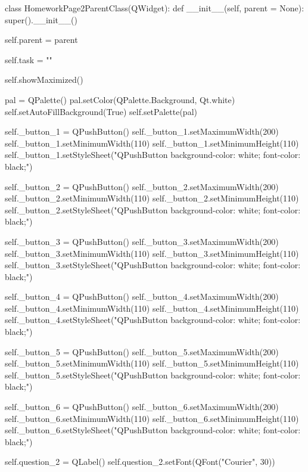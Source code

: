 \begin{python}
class HomeworkPage2ParentClass(QWidget):
    def __init__(self, parent = None):
        super().__init__()

        self.parent = parent

        self.task = ""

        self.showMaximized()

        pal = QPalette()
        pal.setColor(QPalette.Background, Qt.white)
        self.setAutoFillBackground(True)
        self.setPalette(pal)

        self._button_1 = QPushButton()
        self._button_1.setMaximumWidth(200)
        self._button_1.setMinimumWidth(110)
        self._button_1.setMinimumHeight(110)
        self._button_1.setStyleSheet("QPushButton {background-color: white; font-color: black;}")
        
        self._button_2 = QPushButton()
        self._button_2.setMaximumWidth(200)
        self._button_2.setMinimumWidth(110)
        self._button_2.setMinimumHeight(110)
        self._button_2.setStyleSheet("QPushButton {background-color: white; font-color: black;}")
  
        self._button_3 = QPushButton()
        self._button_3.setMaximumWidth(200)
        self._button_3.setMinimumWidth(110)
        self._button_3.setMinimumHeight(110)
        self._button_3.setStyleSheet("QPushButton {background-color: white; font-color: black;}")
        
        self._button_4 = QPushButton()
        self._button_4.setMaximumWidth(200)
        self._button_4.setMinimumWidth(110)
        self._button_4.setMinimumHeight(110)
        self._button_4.setStyleSheet("QPushButton {background-color: white; font-color: black;}")
        
        self._button_5 = QPushButton()
        self._button_5.setMaximumWidth(200)
        self._button_5.setMinimumWidth(110)
        self._button_5.setMinimumHeight(110)
        self._button_5.setStyleSheet("QPushButton {background-color: white; font-color: black;}")
        
        self._button_6 = QPushButton()
        self._button_6.setMaximumWidth(200)
        self._button_6.setMinimumWidth(110)
        self._button_6.setMinimumHeight(110)
        self._button_6.setStyleSheet("QPushButton {background-color: white; font-color: black;}")

        self.question_2 = QLabel()       
        self.question_2.setFont(QFont("Courier", 30))
        

\end{python}
